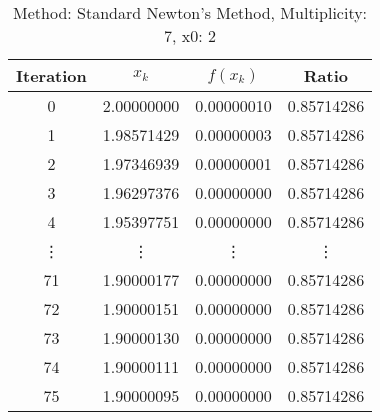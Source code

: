 \begin{table}
\centering
\caption{Method: Standard Newton's Method, Multiplicity: 7, x0: 2}
\label{tab:table_Standard_Newton's_Method_7_2}
\begin{tabular}{c c c c}
\toprule
Iteration &      $x_k$ &   $f(x_k)$ &      Ratio \\
\midrule
        0 & 2.00000000 & 0.00000010 & 0.85714286 \\
        1 & 1.98571429 & 0.00000003 & 0.85714286 \\
        2 & 1.97346939 & 0.00000001 & 0.85714286 \\
        3 & 1.96297376 & 0.00000000 & 0.85714286 \\
        4 & 1.95397751 & 0.00000000 & 0.85714286 \\
   \vdots &     \vdots &     \vdots &     \vdots \\
       71 & 1.90000177 & 0.00000000 & 0.85714286 \\
       72 & 1.90000151 & 0.00000000 & 0.85714286 \\
       73 & 1.90000130 & 0.00000000 & 0.85714286 \\
       74 & 1.90000111 & 0.00000000 & 0.85714286 \\
       75 & 1.90000095 & 0.00000000 & 0.85714286 \\
\bottomrule
\end{tabular}
\end{table}
